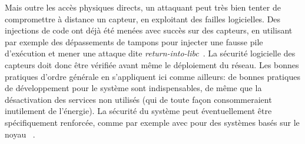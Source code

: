 Mais outre les accès physiques directs, un attaquant peut très bien tenter de compromettre à distance un capteur, en exploitant des failles logicielles.
Des injections de code ont déjà été menées avec succès sur des capteurs, en utilisant par exemple des dépassements de tampons pour injecter une fausse pile d'exécution et mener une attaque dite \textit{return-into-libc}~\cite{FC08}.
La sécurité logicielle des capteurs doit donc être vérifiée avant même le déploiement du réseau.
Les bonnes pratiques d'ordre générale en \secu s'appliquent ici comme ailleurs: de bonnes pratiques de développement pour le système sont indispensables, de même que la désactivation des services non utilisés (qui de toute façon consommeraient inutilement de l'énergie).
La sécurité du système peut éventuellement être spécifiquement renforcée, comme par exemple avec \mbox{} pour des systèmes basés sur le noyau ~\cite{GFN11}.
